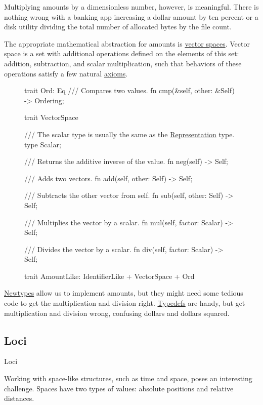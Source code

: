 \documentclass{article}
\begin{document}
Multiplying amounts by a dimensionless number, however, is meaningful.
There is nothing wrong with a banking app increasing a dollar amount by ten percent or a disk utility dividing the total number of allocated bytes by the file count.

The appropriate mathematical abstraction for amounts is \href{https://en.wikipedia.org/wiki/Vector_space}{vector spaces}.
Vector space is a set with additional operations defined on the elements of this set: addition, subtraction, and scalar multiplication, such that behaviors of these operations satisfy a few natural \href{https://en.wikipedia.org/wiki/Vector_space#Definition_and_basic_properties}{axioms}.

\begin{figure}
\begin{code}[rust]
trait Ord: Eq {
  /// Compares two values.
  fn cmp(&self, other: &Self) -> Ordering;
}

trait VectorSpace {
  /// The scalar type is usually the same as the \href{#representation-type}{Representation} type.
  type Scalar;

  /// Returns the additive inverse of the value.
  fn neg(self) -> Self;

  /// Adds two vectors.
  fn add(self, other: Self) -> Self;

  /// Subtracts the other vector from self.
  fn sub(self, other: Self) -> Self;

  /// Multiplies the vector by a scalar.
  fn mul(self, factor: Scalar) -> Self;

  /// Divides the vector by a scalar.
  fn div(self, factor: Scalar) -> Self;
}

trait AmountLike: IdentifierLike + VectorSpace + Ord {}
\end{code}
\end{figure}

\href{#newtypes}{Newtypes} allow us to implement amounts, but they might need some tedious code to get the multiplication and division right.
\href{#typdefs}{Typedefs} are handy, but get multiplication and division wrong, confusing dollars and dollars squared.

\subsection{Loci}{Loci}

Working with space-like structures, such as time and space, poses an interesting challenge.
Spaces have two types of values: absolute positions and relative distances.
\end{document}
